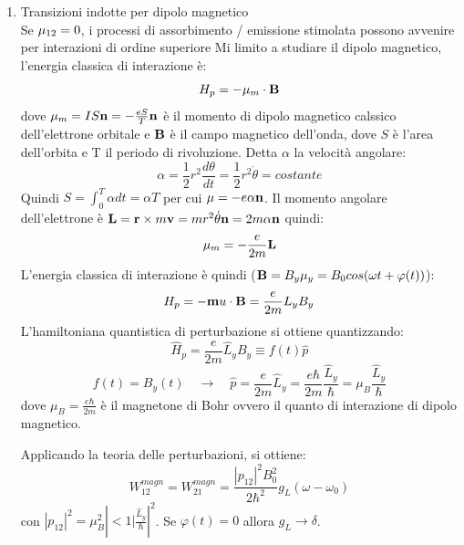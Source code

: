 \begin{enumerate}
    \item Transizioni indotte per dipolo magnetico\\
    Se $\*\mu_{12} = 0$, i processi di assorbimento / emissione stimolata possono avvenire per interazioni di ordine superiore
    Mi limito a studiare il dipolo magnetico, l'energia classica di interazione è:
    \begin{equation}
        H_p = - \mathbf{\mu}_m \cdot \mathbf{B}
    \end{equation}
    dove $\mathbf{\mu}_m = IS \mathbf{n} = -\frac{e S}{T} \mathbf{n}$ è il momento di dipolo magnetico calssico dell'elettrone orbitale e $\mathbf{B}$ è il campo magnetico dell'onda, dove $S$ è l'area dell'orbita e T il periodo di rivoluzione.
    Detta $\alpha$ la velocità angolare:
    \begin{equation}
        \alpha = \frac{1}{2} r^2 \frac{d\theta}{dt} = \frac{1}{2} r^2 \dot{\theta} = costante
    \end{equation}
    Quindi $S = \int_0^T \alpha dt = \alpha T$ per cui $\mathbf{\mu} = -e \alpha \mathbf{n}$.
    Il momento angolare dell'elettrone è $\mathbf{L} = \mathbf{r} \times m\mathbf{v} = mr^2 \dot{\theta} \mathbf{n} = 2m \alpha \mathbf{n}$ quindi:
    \begin{equation}
        \mathbf{\mu}_{m} = -\frac{e}{2m} \mathbf{L}
    \end{equation}
    L'energia classica di interazione è quindi ($\mathbf{B} = B_y \mathbf{\mu}_y = B_0 cos(\omega t + \varphi(t))$):
    \begin{equation}
        H_p = -\mathbf{m}u \cdot \mathbf{B} = \frac{e}{2m} L_y B_y
    \end{equation}
    L'hamiltoniana quantistica di perturbazione si ottiene quantizzando:
    \begin{equation}
        \hat{H}_p = \frac{e}{2m} \hat{L}_y B_y \equiv f(t) \hat{p}
    \end{equation}
    \begin{equation}
        f(t) = B_y(t) \quad \rightarrow \quad \hat{p} = \frac{e}{2m} \hat{L}_y = \frac{e\hbar}{2m} \frac{\hat{L}_y}{\hbar} = \mu_B \frac{\hat{L}_y}{\hbar}
    \end{equation}
    dove $\mu_B = \frac{e\hbar}{2m}$ è il magnetone di Bohr ovvero il quanto di interazione di dipolo magnetico.
    
    Applicando la teoria delle perturbazioni, si ottiene:
    \begin{equation}
        W_{12}^{magn} = W_{21}^{magn} = \frac{|p_{12}|^2 B_0^2}{2\hbar^2} g_L(\omega - \omega_0)
    \end{equation}
    con $|p_{12}|^2 = \mu_B^2 \left| <1|\frac{\hat{L}_y}{\hbar}\right|^2$.
    Se $\varphi(t) = 0$ allora $g_L \rightarrow \delta$.
    

\end{enumerate}
